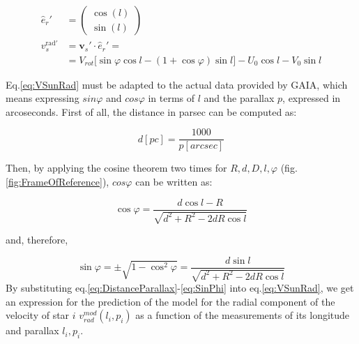 \begin{equation}\label{eq:VSunRad}
    \begin{aligned}
        \hat{e}_r' &= \begin{pmatrix} \cos(l) \\ \sin(l) \end{pmatrix} \\
        v_s^{\text{rad}'}  &= \bm{v}_s' \cdot \hat{e}_r' = \\ 
        &=V_{rot} \biggl[ \sin\varphi \cos l - (1 + \cos\varphi)\sin l \biggr] - U_0 \cos l - V_0 \sin l
    \end{aligned}
\end{equation}
\noindent




Eq.\ref{eq:VSunRad} must be adapted to the actual data provided by GAIA, which means expressing $sin\varphi$ and $cos\varphi$ in terms of $l$ and the parallax $p$, expressed in arcoseconds. First of all, the distance in parsec can be computed as:

\begin{equation}\label{eq:DistanceParallax}
    d[pc] = \frac{1000}{p[arcsec]}
\end{equation}

\noindent
Then, by applying the cosine theorem two times for $R, d, D, l, \varphi$ (fig.\ref{fig:FrameOfReference}), $cos\varphi$ can be written as:

\begin{equation}\label{eq:CosPhi}
    \cos\varphi = \frac{d \cos l - R}{\sqrt{d^2 + R^2 - 2dR \cos l}}
\end{equation}

\noindent
and, therefore,

\begin{equation}\label{eq:SinPhi}
    \sin\varphi = \pm \sqrt{1 - \cos^2 \varphi} = \frac{d\sin l}{\sqrt{d^2 + R^2 -2dR \cos l}}
\end{equation}
\noindent
By substituting eq.\ref{eq:DistanceParallax}-\ref{eq:SinPhi} into eq.\ref{eq:VSunRad}, we get an expression for the prediction of the model for the radial component of the velocity of star $i$ $v_{rad}^{mod}(l_i, p_i)$ as a function of the measurements of its longitude and parallax $l_i, p_i$.